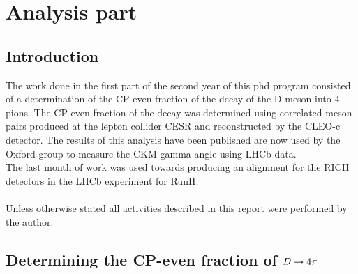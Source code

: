 \setcounter{chapter}{1}
\chapter*{Analysis part}
\section{Introduction}
The work done in the first part of the second year of this phd program consisted of a determination of the CP-even fraction of the decay of the D meson into 4 pions. The CP-even fraction of the decay was determined using correlated \D meson pairs produced at the lepton collider CESR and reconstructed by the CLEO-c detector. The results of this analysis have been published are now used by the Oxford group to measure the CKM gamma angle using LHCb data. \\
The last month of work was used towards producing an alignment for the RICH detectors in the LHCb experiment for RunII.\\
\\
Unless otherwise stated all activities described in this report were performed by the author.\\

\section{Determining the CP-even fraction of $D \rightarrow 4\pi $}
